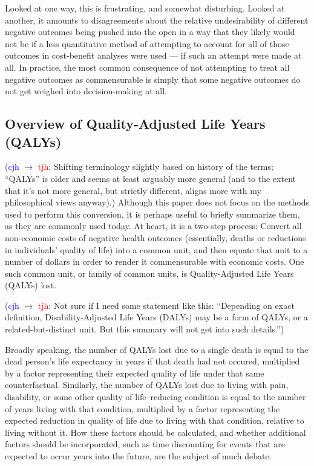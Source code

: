 \documentclass[12pt]{article}
\newcommand{\cjh}{\textcolor{blue}{cjh}}
\newcommand{\tjh}{\textcolor{red}{tjh}}
\newcommand{\msg}[3]{(#1 $\rightarrow$ #2: #3)}
\newcommand{\mct}[1]{\msg\cjh\tjh{#1}}
\begin{document}
        Looked at one way, this is frustrating, and somewhat disturbing. Looked at another, it amounts to disagreements about the relative undesirability of different negative outcomes being pushed into the open in a way that they likely would not be if a less quantitative method of attempting to account for all of those outcomes in cost-benefit analyses were used --- if such an attempt were made at all. In practice, the most common consequence of not attempting to treat all negative outcomes as commensurable is simply that some negative outcomes do not get weighed into decision-making at all.

        \subsection{Overview of Quality-Adjusted Life Years (QALYs)}
            \mct{Shifting terminology slightly based on history of the terms; ``QALYs'' is older and seems at least arguably more general (and to the extent that it's not more general, but strictly different, aligns more with my philosophical views anyway).}
            Although this paper does not focus on the methods used to perform this conversion, it is perhaps useful to briefly summarize them, as they are commonly used today. At heart, it is a two-step process: Convert all non-economic costs of negative health outcomes (essentially, deaths or reductions in individuals' quality of life) into a common unit, and then equate that unit to a number of dollars in order to render it commensurable with economic costs. One such common unit, or family of common units, is Quality-Adjusted Life Years (QALYs) lost.
            
            \mct{Not sure if I need some statement like this: ``Depending on exact definition, Disability-Adjusted Life Years (DALYs) may be a form of QALYs, or a related-but-distinct unit. But this summary will not get into such details.''}

            Broadly speaking, the number of QALYs lost due to a single death is equal to the dead person's life expectancy in years if that death had not occured, multiplied by a factor representing their expected quality of life under that same counterfactual. Similarly, the number of QALYs lost due to living with pain, disability, or some other quality of life--reducing condition is equal to the number of years living with that condition, multiplied by a factor representing the expected reduction in quality of life due to living with that condition, relative to living without it. How these factors should be calculated, and whether additional factors should be incorporated, such as time discounting for events that are expected to occur years into the future, are the subject of much debate.
\end{document}
